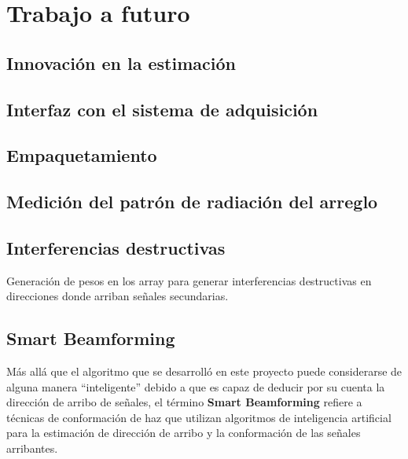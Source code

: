 \chapter{Trabajo a futuro}\label{ch:futuro}

\section{Innovación en la estimación}\label{subc:futuro_innovacion}

\section{Interfaz con el sistema de adquisición}\label{subc:futuro_interfaz}

\section{Empaquetamiento}\label{subc:futuro_packet}

\section{Medición del patrón de radiación del arreglo}\label{subc:futuro_patron}

\section{Interferencias destructivas}
Generación de pesos en los array para generar interferencias destructivas en direcciones donde arriban señales secundarias.

\section{Smart Beamforming}\label{subc_smartbeamforming}
Más allá que el algoritmo que se desarrolló en este proyecto puede considerarse de alguna manera ``inteligente'' debido a que es capaz de deducir por su cuenta la dirección de arribo de señales, el término \textbf{Smart Beamforming} refiere a técnicas de conformación de haz que utilizan algoritmos de inteligencia artificial para la estimación de dirección de arribo y la conformación de las señales arribantes.